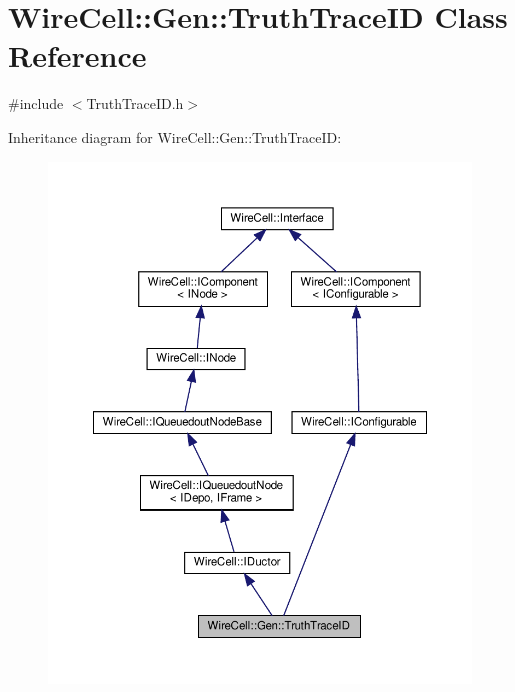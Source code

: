 \hypertarget{class_wire_cell_1_1_gen_1_1_truth_trace_i_d}{}\section{Wire\+Cell\+:\+:Gen\+:\+:Truth\+Trace\+ID Class Reference}
\label{class_wire_cell_1_1_gen_1_1_truth_trace_i_d}


{\ttfamily \#include $<$Truth\+Trace\+I\+D.\+h$>$}



Inheritance diagram for Wire\+Cell\+:\+:Gen\+:\+:Truth\+Trace\+ID\+:
\nopagebreak
\begin{figure}[H]
\begin{center}
\leavevmode
\includegraphics[width=350pt]{class_wire_cell_1_1_gen_1_1_truth_trace_i_d__inherit__graph}
\end{center}
\end{figure}


